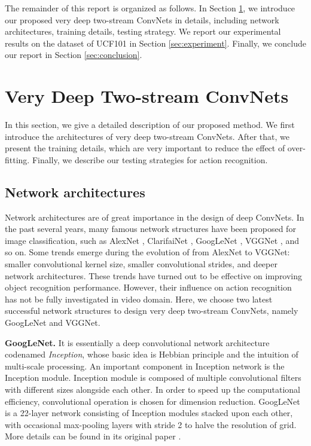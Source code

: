 \documentclass[10pt,twocolumn,letterpaper]{article}
\begin{document}
The remainder of this report is organized as follows. In Section \ref{sec:method}, we introduce our proposed very deep two-stream ConvNets in details, including network architectures, training details, testing strategy. We report our experimental results on the dataset of UCF101 in Section \ref{sec:experiment}. Finally, we conclude our report in Section \ref{sec:conclusion}.

\section{Very Deep Two-stream ConvNets}
\label{sec:method}

In this section, we give a detailed description of our proposed method. We first introduce the architectures of very deep two-stream ConvNets. After that, we present the training details, which are very important to reduce the effect of over-fitting. Finally, we describe our testing strategies for action recognition.

\subsection{Network architectures}
Network architectures are of great importance in the design of deep ConvNets. In the past several years, many famous network structures have been proposed for image classification, such as AlexNet \cite{KrizhevskySH12}, ClarifaiNet \cite{ZeilerF14}, GoogLeNet \cite{SzegedyLJSRAEVR14}, VGGNet \cite{SimonyanZ14a}, and so on. Some trends emerge during the evolution of from AlexNet to VGGNet: smaller convolutional kernel size, smaller convolutional strides, and deeper network architectures. These trends have turned out to be effective on improving object recognition performance. However, their influence on action recognition has not be fully investigated in video domain. Here, we choose two latest successful network structures to design very deep two-stream ConvNets, namely GoogLeNet and VGGNet.

\textbf{GoogLeNet.} It is essentially a deep convolutional network architecture codenamed \emph{Inception}, whose basic idea is Hebbian principle and the intuition of multi-scale processing. An important component in Inception network is the Inception module. Inception module is composed of multiple convolutional filters with different sizes alongside each other. In order to speed up the computational efficiency,  convolutional operation is chosen for dimension reduction. GoogLeNet is a 22-layer network consisting of Inception modules stacked upon each other, with occasional max-pooling layers with stride 2 to halve the resolution of grid. More details can be found in its original paper \cite{SzegedyLJSRAEVR14}.
\end{document}
